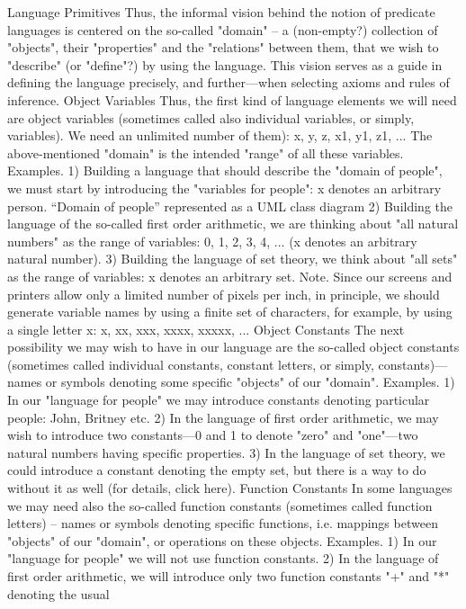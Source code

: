 Language Primitives
Thus, the informal vision behind the notion of predicate languages is centered on the so-called "domain"
– a (non-empty?) collection of "objects", their "properties" and the "relations" between them, that we wish
to "describe" (or "define"?) by using the language. This vision serves as a guide in defining the language
precisely, and further---when selecting axioms and rules of inference.
Object Variables
Thus, the first kind of language elements we will need are object variables (sometimes called also
individual variables, or simply, variables). We need an unlimited number of them):
x, y, z, x1, y1, z1, ...
The above-mentioned "domain" is the intended "range" of all these variables.
Examples. 1) Building a language that should describe the "domain of people", we must start by introducing the "variables for
people": x denotes an arbitrary person.
``Domain of people'' represented as a UML class diagram
2) Building the language of the so-called first order arithmetic, we are thinking about "all natural numbers" as the range of
variables: 0, 1, 2, 3, 4, ... (x denotes an arbitrary natural number).
3) Building the language of set theory, we think about "all sets" as the range of variables: x denotes an arbitrary set.
Note. Since our screens and printers allow only a limited number of pixels per inch, in principle, we
should generate variable names by using a finite set of characters, for example, by using a single letter x:
x, xx, xxx, xxxx, xxxxx, ...
Object Constants
The next possibility we may wish to have in our language are the so-called object constants (sometimes
called individual constants, constant letters, or simply, constants)---names or symbols denoting some
specific "objects" of our "domain".
Examples. 1) In our "language for people" we may introduce constants denoting particular people: John, Britney etc.
2) In the language of first order arithmetic, we may wish to introduce two constants---0 and 1 to denote "zero" and "one"---two
natural numbers having specific properties.
3) In the language of set theory, we could introduce a constant denoting the empty set, but there is a way to do without it as
well (for details, click here).
Function Constants
In some languages we may need also the so-called function constants (sometimes called function letters)
– names or symbols denoting specific functions, i.e. mappings between "objects" of our "domain", or
operations on these objects.
Examples. 1) In our "language for people" we will not use function constants.
2) In the language of first order arithmetic, we will introduce only two function constants "+" and "*" denoting the usual
